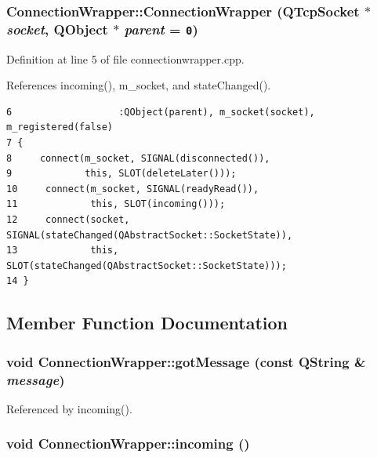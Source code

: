 \subsubsection{\setlength{\rightskip}{0pt plus 5cm}ConnectionWrapper::ConnectionWrapper (QTcpSocket $\ast$ {\em socket}, {\bf QObject} $\ast$ {\em parent} = {\tt 0})}\label{classConnectionWrapper_9fb601f65a6f81e37f55a1cb61dcedd0}




Definition at line 5 of file connectionwrapper.cpp.

References incoming(), m\_\-socket, and stateChanged().

\begin{Code}\begin{verbatim}6                   :QObject(parent), m_socket(socket), m_registered(false)
7 {
8     connect(m_socket, SIGNAL(disconnected()),
9             this, SLOT(deleteLater()));
10     connect(m_socket, SIGNAL(readyRead()),
11             this, SLOT(incoming()));
12     connect(socket, SIGNAL(stateChanged(QAbstractSocket::SocketState)),
13             this, SLOT(stateChanged(QAbstractSocket::SocketState)));
14 }
\end{verbatim}
\end{Code}




\subsection{Member Function Documentation}
\subsubsection{\setlength{\rightskip}{0pt plus 5cm}void ConnectionWrapper::gotMessage (const QString \& {\em message})\hspace{0.3cm}{\tt  [signal]}}\label{classConnectionWrapper_9f4380ec379556532682fa776174daef}




Referenced by incoming().
\subsubsection{\setlength{\rightskip}{0pt plus 5cm}void ConnectionWrapper::incoming ()\hspace{0.3cm}{\tt  [protected, slot]}}\label{classConnectionWrapper_2a71069fecee1f382b9ac7947bc29736}




